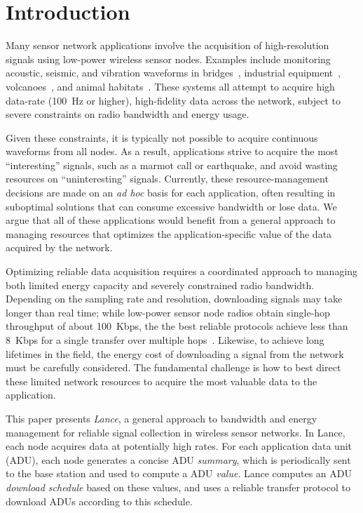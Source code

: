 \section{Introduction}

Many sensor network applications involve the acquisition
of high-resolution signals using low-power wireless sensor nodes. Examples
include monitoring acoustic, seismic, and vibration waveforms in
bridges~\cite{ggb-ipsn07}, industrial equipment~\cite{intel-northseasensys}, 
volcanoes~\cite{volcano-osdi06}, and animal
habitats~\cite{girod-ipsn07,enviromic}.  These systems all attempt to acquire
high data-rate (100~Hz or higher), high-fidelity data across the network,
subject to severe constraints on radio bandwidth and energy usage.

Given these constraints, it is typically not possible to acquire
continuous waveforms from all nodes.  As a result, applications strive
to acquire the most ``interesting'' signals, such as a marmot call or
earthquake, and avoid wasting resources on ``uninteresting'' signals.
Currently, these resource-management decisions are made on an {\em ad
hoc} basis for each application, often resulting in suboptimal solutions
that can consume excessive bandwidth or lose data.  We argue that all
of these applications would benefit from a general approach to managing
resources that optimizes the application-specific value of the
data acquired by the network.

Optimizing reliable data acquisition requires a coordinated approach
to managing both limited energy capacity and severely constrained
radio bandwidth. Depending on the sampling rate and
resolution, downloading signals may take longer than real time;
while low-power 
sensor node radios obtain single-hop throughput of about 100~Kbps, the
the best reliable protocols achieve less than 
8~Kbps for a single transfer over multiple hops~\cite{flush-sensys07}. 
Likewise, to achieve long lifetimes in the field, the energy cost of 
downloading a signal from the network must be carefully considered. 
The fundamental challenge is how to best direct these limited network
resources to acquire the most valuable data to the application.

This paper presents {\em Lance}, a general approach to bandwidth and energy
management for reliable signal collection in wireless sensor networks. In
Lance, each node acquires data at potentially high rates. For each
application data unit (ADU), each node generates a concise ADU {\em summary},
which is periodically sent to the base station and used to compute a ADU {\em
value}.  Lance computes an ADU {\em download schedule} based on these values,
and uses a reliable transfer protocol to download ADUs according to this
schedule.

